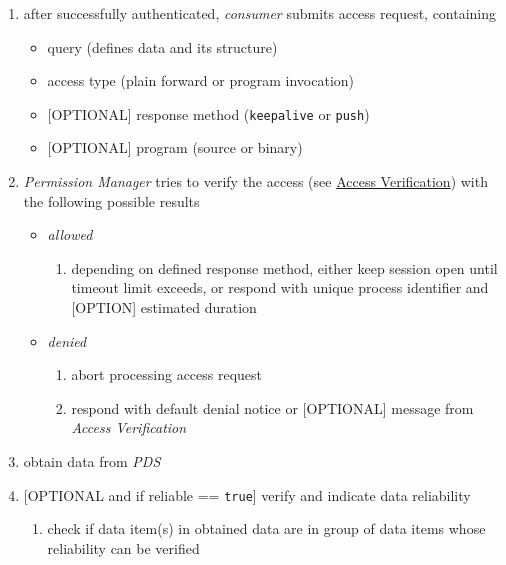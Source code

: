 \documentclass[12pt,english,a4paper,titlepage,cleardoublepage=empty,dottedtoc]{report}
\providecommand{\tightlist}{%
  \setlength{\itemsep}{0pt}\setlength{\parskip}{0pt}}
\begin{document}
\begin{enumerate}
\def\labelenumi{\arabic{enumi}.}
\item
  after successfully authenticated, \emph{consumer} submits access
  request, containing

  \begin{itemize}
  \tightlist
  \item
    query (defines data and its structure)
  \item
    access type (plain forward or program invocation)
  \item
    {[}OPTIONAL{]} response method (\texttt{keepalive} or \texttt{push})
  \item
    {[}OPTIONAL{]} program (source or binary)
  \end{itemize}
\item
  \emph{Permission Manager} tries to verify the access (see
  \protect\hyperlink{access-verification}{Access Verification}) with the
  following possible results

  \begin{itemize}
  \tightlist
  \item
    \emph{allowed}

    \begin{enumerate}
    \def\labelenumii{\arabic{enumii})}
    \tightlist
    \item
      depending on defined response method, either keep session open
      until timeout limit exceeds, or respond with unique process
      identifier and {[}OPTION{]} estimated duration
    \end{enumerate}
  \item
    \emph{denied}

    \begin{enumerate}
    \def\labelenumii{\arabic{enumii})}
    \tightlist
    \item
      abort processing access request
    \item
      respond with default denial notice or {[}OPTIONAL{]} message from
      \emph{Access Verification}
    \end{enumerate}
  \end{itemize}
\item
  obtain data from \emph{PDS}
\item
  {[}OPTIONAL and if reliable == \texttt{true}{]} verify and indicate
  data reliability

  \begin{enumerate}
  \def\labelenumii{\arabic{enumii})}
  \tightlist
  \item
    check if data item(s) in obtained data are in group of data items
    whose reliability can be verified


\end{enumerate}
\end{enumerate}
\end{document}
